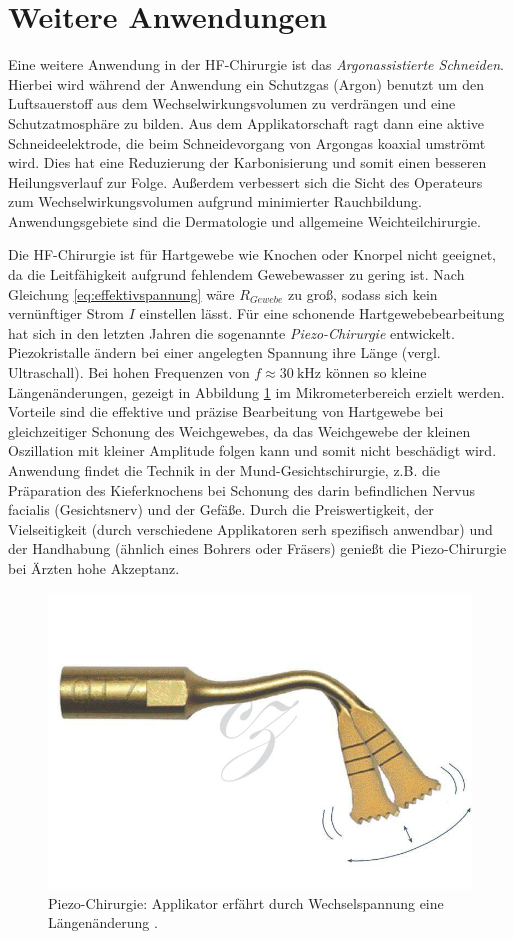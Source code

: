 \documentclass[letterpaper,12pt]{article}
\begin{document}
			
	\section{Weitere Anwendungen}
			
			Eine weitere Anwendung in der HF-Chirurgie ist das \emph{Argonassistierte Schneiden}. Hierbei wird während der Anwendung ein Schutzgas (Argon) benutzt um den Luftsauerstoff aus dem Wechselwirkungsvolumen zu verdrängen und eine Schutzatmosphäre zu bilden. Aus dem Applikatorschaft ragt dann eine aktive Schneideelektrode, die beim Schneidevorgang von Argongas koaxial umströmt wird. Dies hat eine Reduzierung der Karbonisierung und somit einen besseren Heilungsverlauf zur Folge. Außerdem verbessert sich die Sicht des Operateurs zum Wechselwirkungsvolumen aufgrund minimierter Rauchbildung. Anwendungsgebiete sind die Dermatologie und allgemeine Weichteilchirurgie.
					
			Die HF-Chirurgie ist für Hartgewebe wie Knochen oder Knorpel nicht geeignet, da die Leitfähigkeit aufgrund fehlendem Gewebewasser zu gering ist. Nach Gleichung \ref{eq:effektivspannung} wäre $R_{Gewebe}$ zu groß, sodass sich kein vernünftiger Strom $I$ einstellen lässt. Für eine schonende Hartgewebebearbeitung hat sich in den letzten Jahren die sogenannte \emph{Piezo-Chirurgie} entwickelt. Piezokristalle ändern bei einer angelegten Spannung ihre Länge (vergl. Ultraschall). Bei hohen Frequenzen von  $f\approx\SI{30}{\kilo\hertz}$ können so kleine Längenänderungen, gezeigt in Abbildung \ref{fig:piezoChirurgie} im Mikrometerbereich erzielt werden. Vorteile sind die effektive und präzise Bearbeitung von Hartgewebe bei gleichzeitiger Schonung des Weichgewebes, da das Weichgewebe der kleinen Oszillation mit kleiner Amplitude folgen kann und somit nicht beschädigt wird. Anwendung findet die Technik in der Mund-Gesichtschirurgie, z.B. die Präparation des Kieferknochens bei Schonung des darin befindlichen Nervus facialis (Gesichtsnerv) und der Gefäße. Durch die Preiswertigkeit, der Vielseitigkeit (durch verschiedene Applikatoren serh spezifisch anwendbar) und der Handhabung (ähnlich eines Bohrers oder Fräsers) genießt die Piezo-Chirurgie bei Ärzten hohe Akzeptanz.
			\begin{figure}[ht] 
				\centering
				\includegraphics[width=0.3\columnwidth]{images/piezoChirurgie.png}
				\caption{		 
					Piezo-Chirurgie: Applikator erfährt durch Wechselspannung eine Längenänderung \cite{piezoChirurgie}.}
				\label{fig:piezoChirurgie}
			\end{figure}
	
\end{document}
